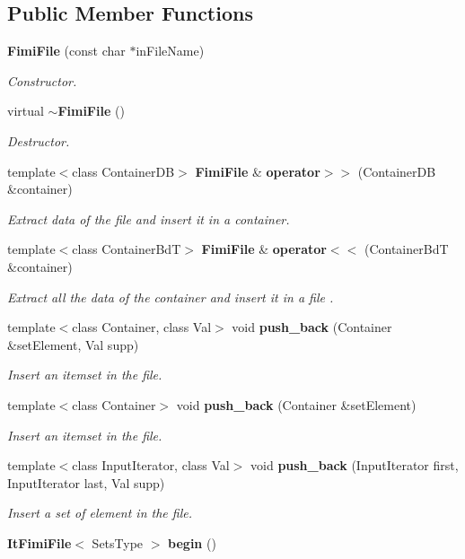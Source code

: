 \subsection*{Public Member Functions}
\begin{CompactItemize}
\item 
{\bf Fimi\-File} (const char $\ast$in\-File\-Name)\label{class_fimi_file_0698069b454374417db777ad6f4cfcfb}

\begin{CompactList}\small\item\em Constructor. \item\end{CompactList}\item 
virtual {\bf $\sim$Fimi\-File} ()
\begin{CompactList}\small\item\em Destructor. \item\end{CompactList}\item 
template$<$class Container\-DB$>$ {\bf Fimi\-File} \& {\bf operator$>$$>$} (Container\-DB \&container)
\begin{CompactList}\small\item\em Extract data of the file and insert it in a container. \item\end{CompactList}\item 
template$<$class Container\-Bd\-T$>$ {\bf Fimi\-File} \& {\bf operator$<$$<$} (Container\-Bd\-T \&container)
\begin{CompactList}\small\item\em Extract all the data of the container and insert it in a file . \item\end{CompactList}\item 
template$<$class Container, class Val$>$ void {\bf push\_\-back} (Container \&set\-Element, Val supp)
\begin{CompactList}\small\item\em Insert an itemset in the file. \item\end{CompactList}\item 
template$<$class Container$>$ void {\bf push\_\-back} (Container \&set\-Element)
\begin{CompactList}\small\item\em Insert an itemset in the file. \item\end{CompactList}\item 
template$<$class Input\-Iterator, class Val$>$ void {\bf push\_\-back} (Input\-Iterator first, Input\-Iterator last, Val supp)
\begin{CompactList}\small\item\em Insert a set of element in the file. \item\end{CompactList}\item 
{\bf It\-Fimi\-File}$<$ Sets\-Type $>$ {\bf begin} ()\label{class_fimi_file_805ab6183fa800eddda7f8f1a72094e0}


\end{CompactItemize}
